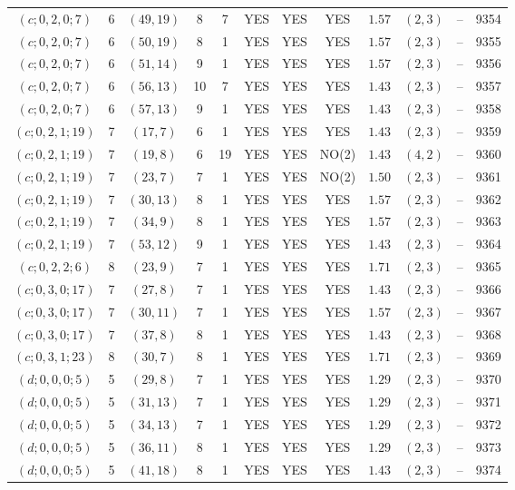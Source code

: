 \begin{longtable}{|c|c|c|c|c|c|c|c|c|c|c|c|}
$(c;0,2,0;7)$ & 6 & $(49,19)$ & 8 & 7 & YES & YES & YES & $1.57$ & $(2,3)$ & -- & 9354\\
$(c;0,2,0;7)$ & 6 & $(50,19)$ & 8 & 1 & YES & YES & YES & $1.57$ & $(2,3)$ & -- & 9355\\
$(c;0,2,0;7)$ & 6 & $(51,14)$ & 9 & 1 & YES & YES & YES & $1.57$ & $(2,3)$ & -- & 9356\\
$(c;0,2,0;7)$ & 6 & $(56,13)$ & 10 & 7 & YES & YES & YES & $1.43$ & $(2,3)$ & -- & 9357\\
$(c;0,2,0;7)$ & 6 & $(57,13)$ & 9 & 1 & YES & YES & YES & $1.43$ & $(2,3)$ & -- & 9358\\
$(c;0,2,1;19)$ & 7 & $(17,7)$ & 6 & 1 & YES & YES & YES & $1.43$ & $(2,3)$ & -- & 9359\\
$(c;0,2,1;19)$ & 7 & $(19,8)$ & 6 & 19 & YES & YES & NO(2) & $1.43$ & $(4,2)$ & -- & 9360\\
$(c;0,2,1;19)$ & 7 & $(23,7)$ & 7 & 1 & YES & YES & NO(2) & $1.50$ & $(2,3)$ & -- & 9361\\
$(c;0,2,1;19)$ & 7 & $(30,13)$ & 8 & 1 & YES & YES & YES & $1.57$ & $(2,3)$ & -- & 9362\\
$(c;0,2,1;19)$ & 7 & $(34,9)$ & 8 & 1 & YES & YES & YES & $1.57$ & $(2,3)$ & -- & 9363\\
$(c;0,2,1;19)$ & 7 & $(53,12)$ & 9 & 1 & YES & YES & YES & $1.43$ & $(2,3)$ & -- & 9364\\
$(c;0,2,2;6)$ & 8 & $(23,9)$ & 7 & 1 & YES & YES & YES & $1.71$ & $(2,3)$ & -- & 9365\\
$(c;0,3,0;17)$ & 7 & $(27,8)$ & 7 & 1 & YES & YES & YES & $1.43$ & $(2,3)$ & -- & 9366\\
$(c;0,3,0;17)$ & 7 & $(30,11)$ & 7 & 1 & YES & YES & YES & $1.57$ & $(2,3)$ & -- & 9367\\
$(c;0,3,0;17)$ & 7 & $(37,8)$ & 8 & 1 & YES & YES & YES & $1.43$ & $(2,3)$ & -- & 9368\\
$(c;0,3,1;23)$ & 8 & $(30,7)$ & 8 & 1 & YES & YES & YES & $1.71$ & $(2,3)$ & -- & 9369\\
$(d;0,0,0;5)$ & 5 & $(29,8)$ & 7 & 1 & YES & YES & YES & $1.29$ & $(2,3)$ & -- & 9370\\
$(d;0,0,0;5)$ & 5 & $(31,13)$ & 7 & 1 & YES & YES & YES & $1.29$ & $(2,3)$ & -- & 9371\\
$(d;0,0,0;5)$ & 5 & $(34,13)$ & 7 & 1 & YES & YES & YES & $1.29$ & $(2,3)$ & -- & 9372\\
$(d;0,0,0;5)$ & 5 & $(36,11)$ & 8 & 1 & YES & YES & YES & $1.29$ & $(2,3)$ & -- & 9373\\
$(d;0,0,0;5)$ & 5 & $(41,18)$ & 8 & 1 & YES & YES & YES & $1.43$ & $(2,3)$ & -- & 9374\\

\end{longtable}
